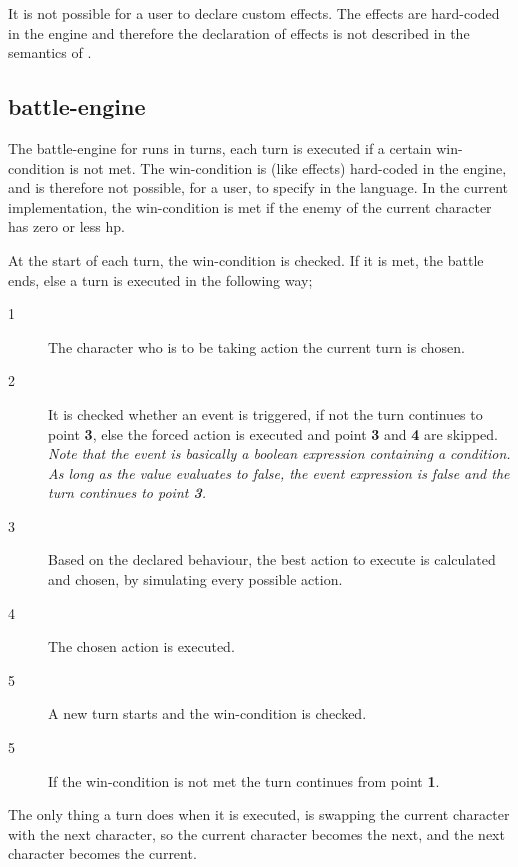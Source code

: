 It is not possible for a user to declare custom effects. The effects are hard-coded in the engine and therefore the declaration of effects is not described in the semantics of \langname{}.


\subsection*{\langname{} battle-engine}
The battle-engine for \langname{} runs in turns, each turn is executed if a certain win-condition is not met. 
The win-condition is (like effects) hard-coded in the engine, and is therefore not possible, for a user, to specify in the \langname{} language. In the current implementation, the win-condition is met if the enemy of the current character has zero or less \ac{hp}.

At the start of each turn, the win-condition is checked. If it is met, the battle ends, else a turn is executed in the following way;

\begin{description}
\item[1] The character who is to be taking action the current turn is chosen.
\item[2] It is checked whether an event is triggered, if not the turn continues to point \textbf{3}, else the forced action is executed and point \textbf{3} and \textbf{4} are skipped.\\
\emph{\small{Note that the event is basically a boolean expression containing a condition. As long as the value evaluates to false, the event expression is false and the turn continues to point \textbf{3}.}}
\item[3] Based on the declared behaviour, the best action to execute is calculated and chosen, by simulating every possible action.
\item[4] The chosen action is executed.
\item[5] A new turn starts and the win-condition is checked.
\item[5] If the win-condition is not met the turn continues from point \textbf{1}.
\end{description}

The only thing a turn does when it is executed, is swapping the current character with the next character, so the current character becomes the next, and the next character becomes the current.\\

